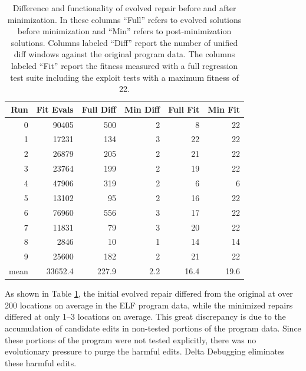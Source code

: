 \documentclass{sigcomm-alternate}
\begin{document}
\begin{table}[htb]
\centering
\begin{tabular}{rrrrrr}
Run  & Fit Evals & Full Diff & Min Diff & Full Fit & Min Fit \\
\toprule
0    & 90405     & 500       & 2        & 8        & 22      \\
1    & 17231     & 134       & 3        & 22       & 22      \\
2    & 26879     & 205       & 2        & 21       & 22      \\
3    & 23764     & 199       & 2        & 19       & 22      \\
4    & 47906     & 319       & 2        & 6        & 6       \\
5    & 13102     & 95        & 2        & 16       & 22      \\
6    & 76960     & 556       & 3        & 17       & 22      \\
7    & 11831     & 79        & 3        & 20       & 22      \\
8    & 2846      & 10        & 1        & 14       & 14      \\
9    & 25600     & 182       & 2        & 21       & 22      \\
\bottomrule
mean & 33652.4   & 227.9     & 2.2      & 16.4     & 19.6    \\
\end{tabular}
\caption{\label{minimized-stats}Difference and functionality of
evolved repair before and after minimization.  In these columns ``Full''
refers to evolved solutions before minimization and ``Min'' refers to
post-minimization solutions.  Columns labeled ``Diff'' report the number
of unified diff windows against the original program data. The columns
labeled ``Fit'' report the fitness measured with a full regression test
suite including the exploit tests with a maximum fitness of 22.}
\end{table}

As shown in Table \ref{minimized-stats}, the initial evolved repair
differed from the original at over 200 locations on average in the ELF
program data, while the minimized repairs differed at only 1--3
locations on average.  This great discrepancy is due to the
accumulation of candidate edits in non-tested portions of the program
data.  Since these portions of the program were not tested explicitly, there was
no evolutionary pressure to purge the harmful edits.  
Delta Debugging eliminates these harmful edits.
\end{document}
